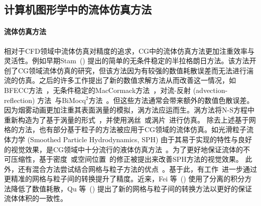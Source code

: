 \subsection{计算机图形学中的流体仿真方法}
\paragraph{流体仿真方法}
相对于CFD领域中流体仿真对精度的追求，CG中的流体仿真方法更加注重效率与灵活性。例如早期Stam~(\citeyear{Stam-1999}) 提出的简单的无条件稳定的半拉格朗日方法。该方法开创了CG领域流体仿真的研究，但该方法因为有较强的数值耗散误差而无法进行湍流的仿真。之后的许多工作提出了新的数值求解方法从而改善这一情况，如BFECC方法~\cite{Kim-2005}，无条件稳定的MacCormack方法~\cite{Selle-2008}，对流-反射 (advection-reflection) 方法~\cite{Zehnder-2018}与BiMocq$^2$方法~\cite{Qu-2019}。但这些方法通常会带来额外的数值色散误差。
因为烟雾动画更加注重其表面涡量的模拟，涡方法应运而生。涡方法将N-S方程中重新构造为了基于涡量的形式~\cite{Park-2005, Selle-2005}，并使用涡丝~\cite{Angelidis-2005, Weissmann-2010}或涡片~\cite{Pfaff-2012, Zhang-2014, Zhang-2015}进行仿真。
除去上述基于网格的方法，也有部分基于粒子的方法被应用于CG领域的流体仿真。如光滑粒子流体力学 (Smoothed Particle Hydrodynamics, SPH) 由于其易于实现的特性与良好的视觉效果，是CG领域中十分流行的液体仿真方法~\cite{Desbrun-1996,Muller-2003,Adams-2007,Becker-2007,Ihmsen-2014-1}。为了更好地保证流体的不可压缩性，基于密度~\cite{Solenthaler-2009, Bender-2015, Ihmsen-2014-2}或空间位置~\cite{Macklin-2013}的修正被提出来改善SPH方法的视觉效果。
此外，还有混合方法尝试结合网格与粒子方法的优点~\cite{Harlow-1962, Brackbill-1986, Foster-1996, Zhu-2005}。基于此，有工作~\cite{Jiang-2015, Fu-2017}进一步通过更精准的网格与粒子间的转换提升了精度。近来，Fei 等~(\citeyear{Fei-2021}) 使用了分离的积分方法降低了数值耗散，Qu 等~(\citeyear{Qu-2022}) 提出了新的网格与粒子间的转换方法以更好的保证流体体积的一致性。

